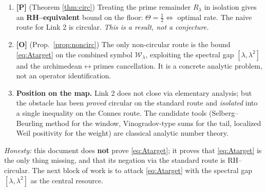 \documentclass[11pt]{article}
\newcommand{\PR}{\textcolor{green!55!black}{\textbf{[P]}}}
\newcommand{\OP}{\textcolor{red!75!black}{\textbf{[O]}}}
\theoremstyle{plain}
\theoremstyle{definition}
\newcommand{\half}{\tfrac12}
\begin{document}
\begin{enumerate}[leftmargin=1.6em]
\item \PR{} (Theorem \ref{thm:circ}) Treating the prime remainder $R_\lambda$ in
isolation gives an \textbf{RH--equivalent} bound on the floor: $\Theta=\half\Leftrightarrow$
optimal rate. The naive route for Link 2 is circular. \emph{This is a
result, not a conjecture.}
\item \OP{} (Prop.\ \ref{prop:noncirc}) The only non-circular route is the bound
\eqref{eq:Atarget} on the combined symbol $\mathcal W_\lambda$, exploiting the spectral
gap $[\lambda,\lambda^2]$ and the archimedean$\leftrightarrow$primes cancellation.
It is a concrete analytic problem, not an operator identification.
\item \textbf{Position on the map.} Link 2 does not close via elementary
analysis; but the obstacle has been \emph{proved} circular on the standard route
and \emph{isolated} into a single inequality on the Connes route. The candidate
tools (Selberg--Beurling method for the window, Vinogradov-type sums for the tail,
localized Weil positivity for the weight) are classical analytic number theory.
\end{enumerate}

\noindent\emph{Honesty:} this document does \textbf{not} prove \eqref{eq:Atarget};
it proves that \eqref{eq:Atarget} is the only thing missing, and that its negation via the
standard route is RH--circular. The next block of work is to attack
\eqref{eq:Atarget} with the spectral gap $[\lambda,\lambda^2]$ as the central resource.
\end{document}
